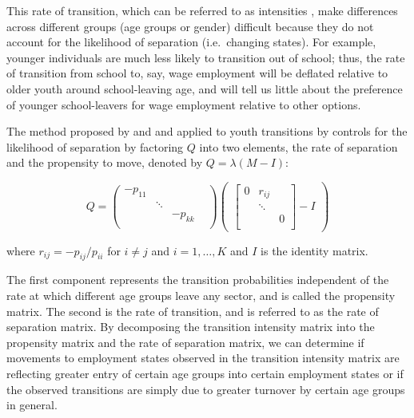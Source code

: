 \documentclass[
  a4paper, twoside, 12pt]{book}
\begin{document}
This rate of transition, which can be referred to as intensities \autocite{bosch2007}, make differences across different groups (age groups or gender) difficult because they do not account for the likelihood of separation (i.e.~changing states). For example, younger individuals are much less likely to transition out of school; thus, the rate of transition from school to, say, wage employment will be deflated relative to older youth around school-leaving age, and will tell us little about the preference of younger school-leavers for wage employment relative to other options.

The method proposed by \textcite{bosch2007} and \textcite{bosch2010} and applied to youth transitions by \textcite{cunningham2011} controls for the likelihood of separation by
factoring \(Q\) into two elements, the rate of separation and the propensity to move, denoted by \(Q = \lambda(M-I)\):

\begin{singlespacing}
$$
Q= \begin{pmatrix}
-p_{11} &  &  &  \\
 & \ddots &  &  \\
 &   & -p_{kk} & \\
\end{pmatrix}
\begin{pmatrix} \begin{bmatrix}
0 &  r_{ij} & \\
 & \ddots &  \\
 &  & 0  \\
\end{bmatrix} - I
\end{pmatrix}
$$
\end{singlespacing}

where \(r_{ij} = -p_{ij}/p_{ii}\) for \(i \neq j\) and \(i = 1, \dots, K\) and \(I\) is the identity matrix.

The first component represents the transition probabilities independent of the rate at which different age groups leave any sector, and is called the propensity matrix. The second is the rate of transition, and is referred to as the rate of separation matrix. By decomposing the transition intensity matrix into the propensity matrix and the rate of separation matrix, we can determine if movements to employment states observed in the transition intensity matrix are reflecting greater entry of certain age groups into certain employment states or if the observed transitions are simply due to greater turnover by certain age groups in general.
\end{document}
